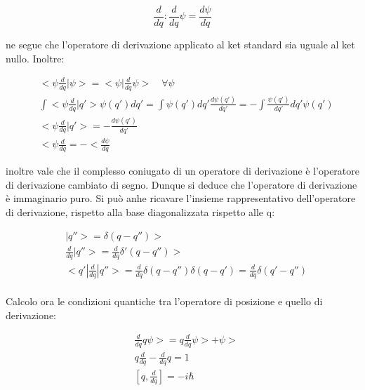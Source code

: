 \documentclass{article}
\begin{document}
\begin{equation}
    \frac{d}{dq} : \frac{d}{dq} \psi = \frac{d \psi}{dq}
\end{equation}

ne segue che l'operatore di derivazione applicato al ket standard sia uguale al ket nullo.
Inoltre:

\begin{equation}
    \begin{aligned}
        & <\psi \frac{d}{dq} | \psi>= <\psi |\frac{d}{dq} \psi> \quad \forall \psi\\
        & \int <\psi \frac{d}{dq} | q'> \psi(q')dq'= \int \psi(q') dq' \frac{d\psi(q')}{dq'}=-\int \frac{\psi(q')}{dq'}dq' \psi(q') \\
        & <\psi \frac{d}{dq}|q'>=-\frac{d\psi(q')}{dq'} \\
        & <\psi \frac{d}{dq} = -<\frac{d\psi}{dq}
    \end{aligned}
\end{equation}

inoltre vale che il complesso coniugato di un operatore di derivazione è l'operatore di derivazione cambiato di segno.
Dunque si deduce che l'operatore di derivazione è immaginario puro.
Si può anhe ricavare l'insieme rappresentativo dell'operatore di derivazione, rispetto alla base diagonalizzata rispetto alle q:

\begin{equation}
    \begin{aligned}
        & |q''>= \delta(q-q'')> \\
        & \frac{d}{dq}|q''>= \frac{d}{dq}\delta'(q-q'')> \\
        & <q'|\frac{d}{dq}|q''>= \frac{d}{dq}\delta(q-q'')\delta(q-q')= \frac{d}{dq} \delta(q'-q'') \\
    \end{aligned}
\end{equation}

Calcolo ora le condizioni quantiche tra l'operatore di posizione e quello di derivazione:

\begin{equation}
    \begin{aligned}
        & \frac{d}{dq} q\psi>= q\frac{d}{dq}\psi> + \psi> \\
        & q\frac{d}{dq}-\frac{d}{dq}q=1 \\
        & [q,\frac{d}{dq}]=-i\hbar
    \end{aligned}
\end{equation}
\end{document}

